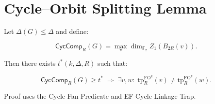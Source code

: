 \section*{Cycle--Orbit Splitting Lemma}

Let $\Delta(G)\le \Delta$ and define:

\[
\mathsf{CycComp}_R(G)
=\max_v \dim_{\mathbb F_2} Z_1(B_{2R}(v)).
\]

Then there exists $t^*(k,\Delta,R)$ such that:

\[
\mathsf{CycComp}_R(G)\ge t^*
\;\Rightarrow\;
\exists v,w:\;
\mathrm{tp}^{\mathrm{FO}^k}_R(v)\neq \mathrm{tp}^{\mathrm{FO}^k}_R(w).
\]

Proof uses the Cycle Fan Predicate and EF Cycle-Linkage Trap.

